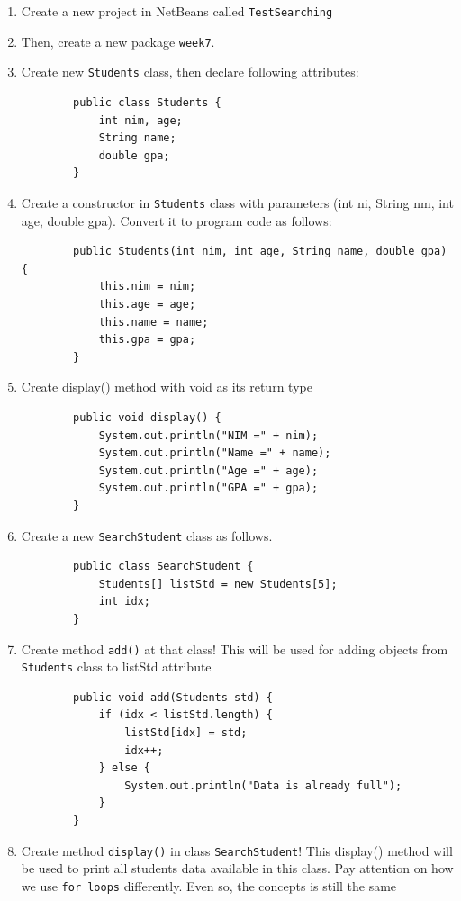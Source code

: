 \documentclass[12pt,titlepage]{article}
\begin{document}
\begin{enumerate}
    \item Create a new project in NetBeans called \texttt{TestSearching}
    \item Then, create a new package \texttt{week7}.
    \item Create new \texttt{Students} class, then declare following attributes:
    \begin{verbatim}
        public class Students {
            int nim, age;
            String name;
            double gpa;
        }
    \end{verbatim}
    \item Create a constructor in \texttt{Students} class with parameters (int ni, String nm, int age, double gpa). Convert it to program code as follows:
    \begin{verbatim}
        public Students(int nim, int age, String name, double gpa) {
            this.nim = nim;
            this.age = age;
            this.name = name;
            this.gpa = gpa;
        }
    \end{verbatim}
    \item Create display() method with void as its return type
    \begin{verbatim}
        public void display() {
            System.out.println("NIM =" + nim);
            System.out.println("Name =" + name);
            System.out.println("Age =" + age);
            System.out.println("GPA =" + gpa);
        }
    \end{verbatim}
    \item Create a new \texttt{SearchStudent} class as follows.
    \begin{verbatim}
        public class SearchStudent {
            Students[] listStd = new Students[5];
            int idx;
        }
    \end{verbatim}
    \item Create method \texttt{add()} at that class! This will be used for adding objects from \texttt{Students} class to listStd attribute
    \begin{verbatim}
        public void add(Students std) {
            if (idx < listStd.length) {
                listStd[idx] = std;
                idx++;
            } else {
                System.out.println("Data is already full");
            }
        }
    \end{verbatim}
    \item Create method \texttt{display()} in class \texttt{SearchStudent}! This display() method will be used to print all students data available in this class. Pay attention on how we use \texttt{for loops} differently. Even so, the concepts is still the same

\end{enumerate}
\end{document}

